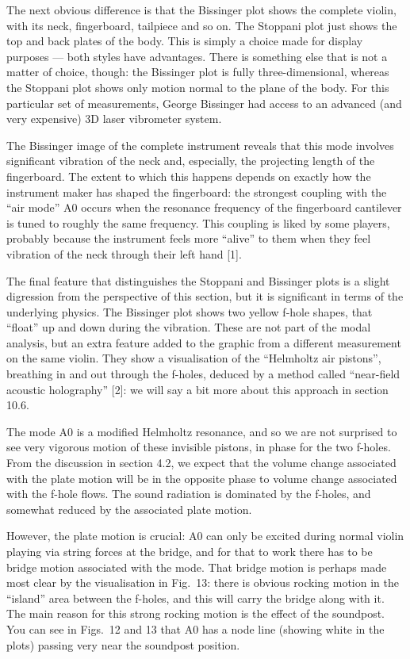   The next obvious difference is that the Bissinger plot shows the complete 
  violin, with its neck, fingerboard, tailpiece and so on. The Stoppani plot 
  just shows the top and back plates of the body. This is simply a choice made 
  for display purposes — both styles have advantages. There is something else 
  that is not a matter of choice, though: the Bissinger plot is fully 
  three-dimensional, whereas the Stoppani plot shows only motion normal to the 
  plane of the body. For this particular set of measurements, George Bissinger 
  had access to an advanced (and very expensive) 3D laser vibrometer system. 

  The Bissinger image of the complete instrument reveals that this mode 
  involves significant vibration of the neck and, especially, the projecting 
  length of the fingerboard. The extent to which this happens depends on 
  exactly how the instrument maker has shaped the fingerboard: the strongest 
  coupling with the “air mode” A0 occurs when the resonance frequency of the 
  fingerboard cantilever is tuned to roughly the same frequency. This coupling 
  is liked by some players, probably because the instrument feels more “alive” 
  to them when they feel vibration of the neck through their left hand [1]. 

  The final feature that distinguishes the Stoppani and Bissinger plots is a 
  slight digression from the perspective of this section, but it is significant 
  in terms of the underlying physics. The Bissinger plot shows two yellow 
  f-hole shapes, that “float” up and down during the vibration. These are not 
  part of the modal analysis, but an extra feature added to the graphic from a 
  different measurement on the same violin. They show a visualisation of the 
  “Helmholtz air pistons”, breathing in and out through the f-holes, deduced by 
  a method called “near-field acoustic holography” [2]: we will say a bit more 
  about this approach in section 10.6. 

  The mode A0 is a modified Helmholtz resonance, and so we are not surprised to 
  see very vigorous motion of these invisible pistons, in phase for the two 
  f-holes. From the discussion in section 4.2, we expect that the volume change 
  associated with the plate motion will be in the opposite phase to volume 
  change associated with the f-hole flows. The sound radiation is dominated by 
  the f-holes, and somewhat reduced by the associated plate motion. 

  However, the plate motion is crucial: A0 can only be excited during normal 
  violin playing via string forces at the bridge, and for that to work there 
  has to be bridge motion associated with the mode. That bridge motion is 
  perhaps made most clear by the visualisation in Fig.\ 13: there is obvious 
  rocking motion in the “island” area between the f-holes, and this will carry 
  the bridge along with it. The main reason for this strong rocking motion is 
  the effect of the soundpost. You can see in Figs.\ 12 and 13 that A0 has a 
  node line (showing white in the plots) passing very near the soundpost 
  position. 

